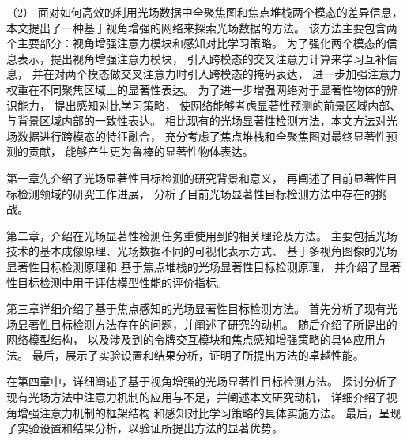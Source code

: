 %
%
（2）
%
%
面对如何高效的利用光场数据中全聚焦图和焦点堆栈两个模态的差异信息，
本文提出了一种基于视角增强的网络来探索光场数据的方法。
%
%
该方法主要包含两个主要部分：视角增强注意力模块和感知对比学习策略。
%
%
为了强化两个模态的信息表示，提出视角增强注意力模块，
引入跨模态的交叉注意力计算来学习互补信息，
并在对两个模态做交叉注意力时引入跨模态的掩码表达，
进一步加强注意力权重在不同聚焦区域上的显著性表达。
%
%
为了进一步增强网络对于显著性物体的辨识能力，
提出感知对比学习策略，
使网络能够考虑显著性预测的前景区域内部、与背景区域内部的一致性表达。
%
%
相比现有的光场显著性检测方法，本文方法对光场数据进行跨模态的特征融合，
充分考虑了焦点堆栈和全聚焦图对最终显著性预测的贡献，
能够产生更为鲁棒的显著性物体表达。






第一章先介绍了光场显著性目标检测的研究背景和意义，
再阐述了目前显著性目标检测领域的研究工作进展，
分析了目前光场显著性目标检测方法中存在的挑战。



第二章，介绍在光场显著性检测任务重使用到的相关理论及方法。
主要包括光场技术的基本成像原理、光场数据不同的可视化表示方式、
基于多视角图像的光场显著性目标检测原理和
基于焦点堆栈的光场显著性目标检测原理，
并介绍了显著性目标检测中用于评估模型性能的评价指标。


第三章详细介绍了基于焦点感知的光场显著性目标检测方法。
首先分析了现有光场显著性目标检测方法存在的问题，并阐述了研究的动机。
随后介绍了所提出的网络模型结构，
以及涉及到的令牌交互模块和焦点感知增强策略的具体应用方法。
最后，展示了实验设置和结果分析，证明了所提出方法的卓越性能。


在第四章中，详细阐述了基于视角增强的光场显著性目标检测方法。
探讨分析了现有光场方法中注意力机制的应用与不足，并阐述本文研究动机，
详细介绍了视角增强注意力机制的框架结构
和感知对比学习策略的具体实施方法。
最后，呈现了实验设置和结果分析，以验证所提出方法的显著优势。































